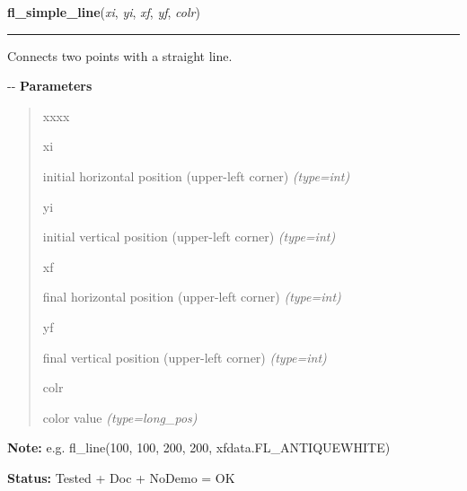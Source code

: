     \label{xformslib:flxbasic:fl_line}

    \vspace{0.5ex}

\hspace{.8\funcindent}\begin{boxedminipage}{\funcwidth}

    \raggedright \textbf{fl\_simple\_line}(\textit{xi}, \textit{yi}, \textit{xf}, \textit{yf}, \textit{colr})

    \vspace{-1.5ex}

    \rule{\textwidth}{0.5\fboxrule}
\setlength{\parskip}{2ex}

Connects two points with a straight line.

-{}-
\setlength{\parskip}{1ex}
      \textbf{Parameters}
      \vspace{-1ex}

      \begin{quote}
        \begin{Ventry}{xxxx}

          \item[xi]


initial horizontal position (upper-left corner)
            {\it (type=int)}

          \item[yi]


initial vertical position (upper-left corner)
            {\it (type=int)}

          \item[xf]


final horizontal position (upper-left corner)
            {\it (type=int)}

          \item[yf]


final vertical position (upper-left corner)
            {\it (type=int)}

          \item[colr]


color value
            {\it (type=long\_pos)}

        \end{Ventry}

      \end{quote}

\textbf{Note:} 
e.g. fl\_line(100, 100, 200, 200, xfdata.FL\_ANTIQUEWHITE)


\textbf{Status:} 
Tested + Doc + NoDemo = OK


    \end{boxedminipage}


